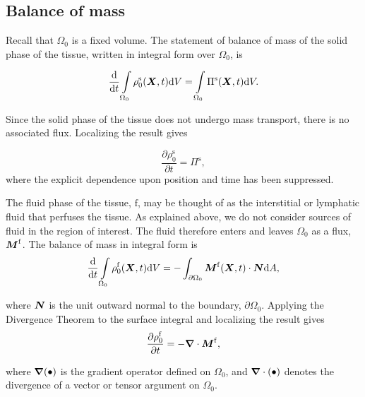 
\subsection{Balance of mass}
\label{balance-of-mass}

Recall that $\Omega_0$ is a fixed volume. The
statement of balance of mass of the solid phase of the tissue,
written in integral form over $\Omega_0$, is

\begin{equation}
\frac{\mathrm{d}}{\mathrm{d}t} \int\limits_{\Omega_0}
\rho_0^\mathrm{s} (\mbox{\boldmath$ X$},t)\mathrm{d}V = \int\limits_{\Omega_0}
\Pi^\mathrm{s} (\mbox{\boldmath$ X$},t)\mathrm{d}V. \label{massbalintA}
\end{equation}

\noindent Since the solid phase of the tissue does not undergo
mass transport, there is no associated flux. Localizing the result
gives

\begin{equation}
\frac{\partial\rho_0^\mathrm{s}}{\partial t} = \Pi^\mathrm{s},
\label{massballocA}
\end{equation}
\noindent where the explicit dependence upon position and time has
been suppressed.

The fluid phase of the tissue, $\mathrm{f}$, may be thought of as
the interstitial or lymphatic fluid that perfuses the tissue. As
explained above, we do not consider sources of fluid in the region
of interest. The fluid therefore enters and leaves $\Omega_0$ as a
flux, $\mbox{\boldmath$ M$}^\mathrm{f}$. The balance of mass in integral form is
\begin{equation}
\frac{\mathrm{d}}{\mathrm{d}t} \int\limits_{\Omega_0}
\rho_0^\mathrm{f} (\mbox{\boldmath$ X$},t)\mathrm{d}V =
-\int_{\partial\Omega_0}\mbox{\boldmath$ M$}^\mathrm{f}(\mbox{\boldmath$ X$},t)\cdot\mbox{\boldmath$ N$} \mathrm{d}A,
\label{massbalintB}
\end{equation}

\noindent where $\mbox{\boldmath$ N$}$ is the unit outward normal to the boundary,
$\partial\Omega_0$. Applying the Divergence Theorem to the surface
integral and localizing the result gives
\begin{equation}
\frac{\partial\rho_0^\mathrm{f}}{\partial t} = -
\mbox{\boldmath$\nabla$}\cdot\mbox{\boldmath$ M$}^\mathrm{f}, \label{massballocB}
\end{equation}

\noindent where $\mbox{\boldmath$\nabla$}(\bullet)$ is the gradient operator
defined on $\Omega_0$, and $\mbox{\boldmath$\nabla$}\cdot(\bullet)$ denotes the
divergence of a vector or tensor argument on $\Omega_0$.

